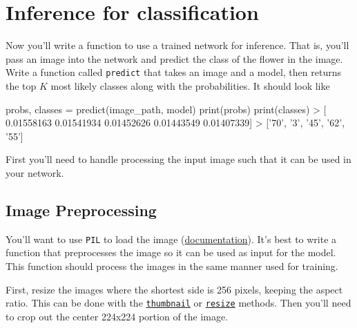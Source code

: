 \documentclass[11pt]{article}
\newenvironment{Shaded}{}{}
\newcommand{\FloatTok}[1]{\textcolor[rgb]{0.25,0.63,0.44}{{#1}}}
\newcommand{\StringTok}[1]{\textcolor[rgb]{0.25,0.44,0.63}{{#1}}}
\newcommand{\NormalTok}[1]{{#1}}
\newcommand{\OperatorTok}[1]{\textcolor[rgb]{0.40,0.40,0.40}{{#1}}}
\newcommand{\BuiltInTok}[1]{{#1}}
\begin{document}
    \section{Inference for
classification}\label{inference-for-classification}

Now you'll write a function to use a trained network for inference. That
is, you'll pass an image into the network and predict the class of the
flower in the image. Write a function called \texttt{predict} that takes
an image and a model, then returns the top \(K\) most likely classes
along with the probabilities. It should look like

\begin{Shaded}
\begin{Highlighting}[]
\NormalTok{probs, classes }\OperatorTok{=}\NormalTok{ predict(image_path, model)}
\BuiltInTok{print}\NormalTok{(probs)}
\BuiltInTok{print}\NormalTok{(classes)}
\OperatorTok{>}\NormalTok{ [ }\FloatTok{0.01558163}  \FloatTok{0.01541934}  \FloatTok{0.01452626}  \FloatTok{0.01443549}  \FloatTok{0.01407339}\NormalTok{]}
\OperatorTok{>}\NormalTok{ [}\StringTok{'70'}\NormalTok{, }\StringTok{'3'}\NormalTok{, }\StringTok{'45'}\NormalTok{, }\StringTok{'62'}\NormalTok{, }\StringTok{'55'}\NormalTok{]}
\end{Highlighting}
\end{Shaded}

First you'll need to handle processing the input image such that it can
be used in your network.

\subsection{Image Preprocessing}\label{image-preprocessing}

You'll want to use \texttt{PIL} to load the image
(\href{https://pillow.readthedocs.io/en/latest/reference/Image.html}{documentation}).
It's best to write a function that preprocesses the image so it can be
used as input for the model. This function should process the images in
the same manner used for training.

First, resize the images where the shortest side is 256 pixels, keeping
the aspect ratio. This can be done with the
\href{http://pillow.readthedocs.io/en/3.1.x/reference/Image.html\#PIL.Image.Image.thumbnail}{\texttt{thumbnail}}
or
\href{http://pillow.readthedocs.io/en/3.1.x/reference/Image.html\#PIL.Image.Image.thumbnail}{\texttt{resize}}
methods. Then you'll need to crop out the center 224x224 portion of the
image.
\end{document}
